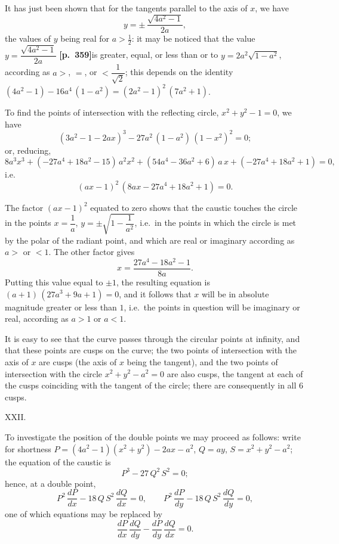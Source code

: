 \documentclass[11pt]{article}
\begin{document}
It has just been shown that for the tangents parallel to the axis of $x$, we have
\[
y = \pm\,\frac{\sqrt{4a^{2}-1}}{2a},
\]
the values of $y$ being real for $a > \tfrac{1}{2}$: it may be noticed that the value $y = \dfrac{\sqrt{4a^{2}-1}}{2a}$ \textbf{[p.~359]}\quad is greater, equal, or less than or to $y = 2a^{2}\sqrt{1 - a^{2}}$, according as $a >$, $=$, or $< \dfrac{1}{\sqrt{2}}$; this depends on the identity $(4a^{2}-1) - 16a^{4}\,(1 - a^{2}) = (2a^{2}-1)^{2}\,(7a^{2}+1)$.

To find the points of intersection with the reflecting circle, $x^{2} + y^{2} - 1 = 0$, we have
\[
(3a^{2} - 1 - 2ax)^{3} - 27a^{2}\,(1 - a^{2})\,(1 - x^{2})^{2} = 0;
\]
or, reducing,
\[
8a^{3}x^{3} + (-27a^{4} + 18a^{2} - 15)\,a^{2}x^{2} + (54a^{4} - 36a^{2} + 6)\,a\,x + (-27a^{4} + 18a^{2} + 1) = 0,
\]
i.e.
\[
(ax - 1)^{2}\,(8ax - 27a^{4} + 18a^{2} + 1) = 0.
\]

The factor $(ax - 1)^{2}$ equated to zero shows that the caustic touches the circle in the points $x = \dfrac{1}{a}$, $y = \pm\sqrt{1 - \dfrac{1}{a^{2}}}$, i.e.\ in the points in which the circle is met by the polar of the radiant point, and which are real or imaginary according as $a >$ or $< 1$. The other factor gives
\[
x = \frac{27a^{4} - 18a^{2} - 1}{8a}.
\]
Putting this value equal to $\pm 1$, the resulting equation is $(a + 1)\,(27a^{3} + 9a + 1) = 0$, and it follows that $x$ will be in absolute magnitude greater or less than $1$, i.e.\ the points in question will be imaginary or real, according as $a > 1$ or $a < 1$.

It is easy to see that the curve passes through the circular points at infinity, and that these points are cusps on the curve; the two points of intersection with the axis of $x$ are cusps (the axis of $x$ being the tangent), and the two points of intersection with the circle $x^{2} + y^{2} - a^{2} = 0$ are also cusps, the tangent at each of the cusps coinciding with the tangent of the circle; there are consequently in all $6$ cusps.

\medskip
\begin{center}XXII.\end{center}

To investigate the position of the double points we may proceed as follows: write for shortness $P = (4a^{2}-1)(x^{2}+y^{2}) - 2ax - a^{2}$, $Q = ay$, $S = x^{2} + y^{2} - a^{2}$; the equation of the caustic is
\[
P^{3} - 27\,Q^{2}\,S^{2} = 0;
\]
hence, at a double point,
\[
P^{2}\,\frac{dP}{dx} - 18\,Q\,S^{2}\,\frac{dQ}{dx} = 0,\qquad P^{2}\,\frac{dP}{dy} - 18\,Q\,S^{2}\,\frac{dQ}{dy} = 0,
\]
one of which equations may be replaced by
\[
\frac{dP}{dx}\,\frac{dQ}{dy} - \frac{dP}{dy}\,\frac{dQ}{dx} = 0.
\]
\end{document}
